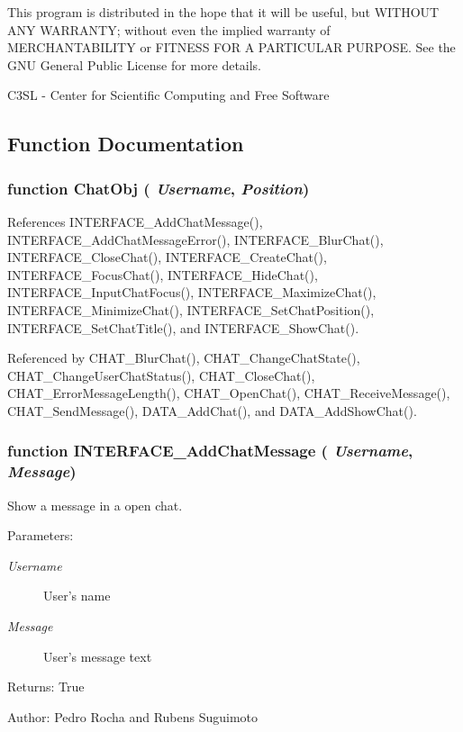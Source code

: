 This program is distributed in the hope that it will be useful, but WITHOUT ANY WARRANTY; without even the implied warranty of MERCHANTABILITY or FITNESS FOR A PARTICULAR PURPOSE. See the GNU General Public License for more details.

C3SL - Center for Scientific Computing and Free Software 

\subsection{Function Documentation}
\subsubsection[ChatObj]{\setlength{\rightskip}{0pt plus 5cm}function ChatObj ( {\em Username}, \/   {\em Position})}\label{interface_2chat_8js_8f8ebabba6bf6bfa4b555ea376d1659d}




References INTERFACE\_\-AddChatMessage(), INTERFACE\_\-AddChatMessageError(), INTERFACE\_\-BlurChat(), INTERFACE\_\-CloseChat(), INTERFACE\_\-CreateChat(), INTERFACE\_\-FocusChat(), INTERFACE\_\-HideChat(), INTERFACE\_\-InputChatFocus(), INTERFACE\_\-MaximizeChat(), INTERFACE\_\-MinimizeChat(), INTERFACE\_\-SetChatPosition(), INTERFACE\_\-SetChatTitle(), and INTERFACE\_\-ShowChat().

Referenced by CHAT\_\-BlurChat(), CHAT\_\-ChangeChatState(), CHAT\_\-ChangeUserChatStatus(), CHAT\_\-CloseChat(), CHAT\_\-ErrorMessageLength(), CHAT\_\-OpenChat(), CHAT\_\-ReceiveMessage(), CHAT\_\-SendMessage(), DATA\_\-AddChat(), and DATA\_\-AddShowChat().
\subsubsection[INTERFACE\_\-AddChatMessage]{\setlength{\rightskip}{0pt plus 5cm}function INTERFACE\_\-AddChatMessage ( {\em Username}, \/   {\em Message})}\label{interface_2chat_8js_7064133797742952c1d840582d8f4616}


Show a message in a open chat. 

\begin{Desc}
\item[Parameters:]
\begin{description}
\item[{\em Username}]User's name \item[{\em Message}]User's message text \end{description}
\end{Desc}
\begin{Desc}
\item[Returns:]True \end{Desc}
\begin{Desc}
\item[Author:]Pedro Rocha and Rubens Suguimoto \end{Desc}


